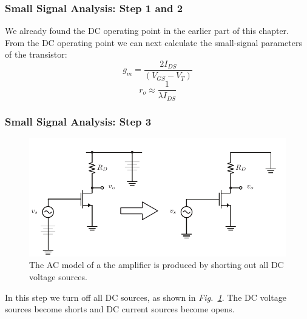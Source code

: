 \subsubsection{Small Signal Analysis:  Step 1 and 2}
We already found the DC operating point in the earlier part of this chapter.  From the DC operating point we can next calculate the small-signal parameters of the transistor:
    \begin{equation}
        {g_m} = \frac{{2{I_{DS}}}}{{({V_{GS}} - {V_T})}}
    \end{equation}
    \begin{equation}
        {r_o} \approx \frac{1}{{\lambda {I_{DS}}}}
    \end{equation}
\subsubsection{Small Signal Analysis:  Step 3}
\begin{figure}[tb]
\centering
\includegraphics[scale=1]{cs_amp_ac}
\caption{The AC model of a the amplifier is produced by shorting out all DC voltage sources.} \label{fig:cs_amp_ac}
\end{figure}
In this step we turn off all DC sources, as shown in \emph{Fig.~\ref{fig:cs_amp_ac}}.  The DC voltage sources become shorts and DC current sources become opens.
